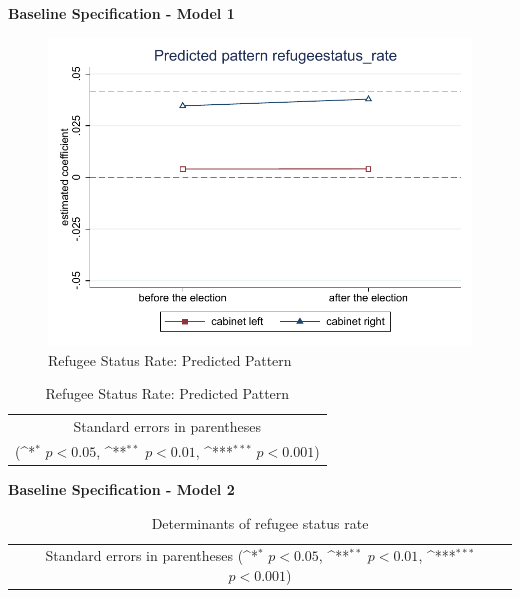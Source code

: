 \documentclass[10pt,a4paper]{scrartcl}
\begin{document}
\clearpage
\textbf{Baseline Specification - Model 1}
\begin{figure}[!ht]
	\centering
	\includegraphics[width=1\textwidth]{figures_edited/refugeestatus_rate_graph1_baseline.pdf}
	\caption{Refugee Status Rate: Predicted Pattern}
\end{figure}

\begin{table}[!ht]\centering
	\renewcommand{\arraystretch}{1.25}
	\def\sym#1{\ifmmode^{#1}\else\(^{#1}\)\fi}
	\caption{Refugee Status Rate: Predicted Pattern}
	\begin{tabular}[]{l*{2}{c}}
		\hline\hline
		
		\hline\hline
		\multicolumn{3}{c}{\footnotesize Standard errors in parentheses} \\
		\multicolumn{3}{c}{\footnotesize (\sym{*} \(p<0.05\), \sym{**} \(p<0.01\), \sym{***} \(p<0.001\))}\\
	\end{tabular}
\end{table}

\clearpage
\textbf{Baseline Specification - Model 2}
\begin{table}[!ht]\centering
	\scriptsize
	\renewcommand{\arraystretch}{1.1}
	\def\sym#1{\ifmmode^{#1}\else\(^{#1}\)\fi}
	\caption{Determinants of refugee status rate}
	\begin{tabular}{l*{3}{c}}
		\hline\hline
		
		\hline\hline
		\multicolumn{4}{c}{\footnotesize Standard errors in parentheses (\sym{*} \(p<0.05\), \sym{**} \(p<0.01\), \sym{***} \(p<0.001\))}\\
	\end{tabular}
\end{table}
\end{document}

